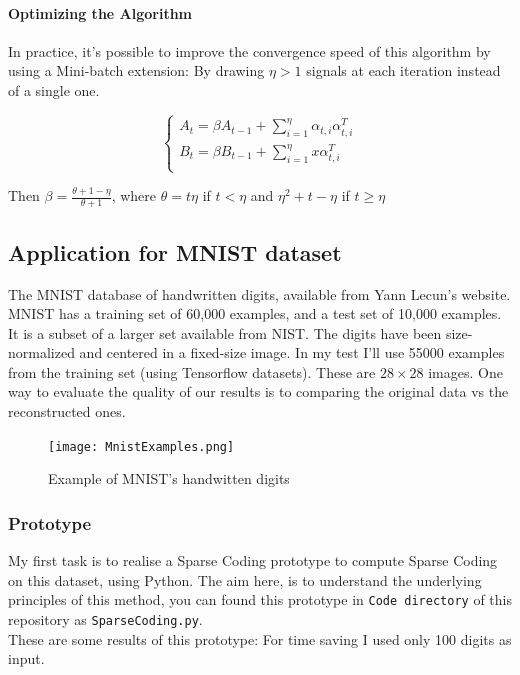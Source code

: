 \documentclass[a4paper,10pt]{article}
\begin{document}
\paragraph{Optimizing the Algorithm}
In practice, it's possible to improve the convergence speed of this algorithm by using a Mini-batch extension: By drawing $\eta > 1 $ signals at each iteration instead of a single one. 
\begin{center}
  \[    \left\{
                \begin{array}{ll}
                  A_t  = \beta A_{t-1} + \sum_{i=1}^{\eta} \alpha_{t,i}\alpha_{t,i}^{T}\\
                  B_t = \beta B_{t-1} + \sum_{i=1}^{\eta}x\alpha_{t,i}^{T}\\
                \end{array}
              \right.
  \]
\end{center}

Then $\beta = \frac{\theta + 1 - \eta}{\theta +1}$, where $\theta = t \eta$ if $ t < \eta$ and $\eta^2 + t - \eta$ if $t \geq \eta$


\subsection{Application for MNIST dataset}
The MNIST database of handwritten digits, available from Yann Lecun's website. MNIST has a training set of 60,000 examples, and a test set of 10,000 examples. It is a subset of a larger set available from NIST. The digits have been size-normalized and centered in a fixed-size image. In my test I'll use 55000 examples from the training set (using Tensorflow datasets). These are $28 \times 28$ images. One way to evaluate the quality of our results is to comparing the original data vs the reconstructed ones. 
\begin{figure}[h]
 \centering
 \texttt{[image: MnistExamples.png]}
 \caption{Example of MNIST's handwitten digits}
\end{figure}
\subsubsection{Prototype}
My first task is to realise a Sparse Coding prototype to compute Sparse Coding on this dataset, using Python. The aim here, is to understand the underlying principles of this method, you can found this prototype in \texttt{Code directory} of this repository as \texttt{SparseCoding.py}. \\
These are some results of this prototype: For time saving I used only 100 digits as input.
\end{document}
